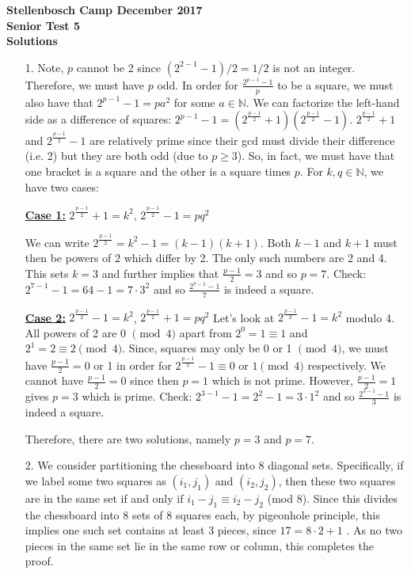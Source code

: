 \documentclass[a4paper, 12pt]{article}
\begin{document}
\begin{center}
\textbf{Stellenbosch Camp December 2017 \\ Senior Test 5} \\
\textbf{Solutions}
\end{center}


\begin{enumerate}

    \item[1.] Note, $p$ cannot be 2 since $(2^{2-1}-1)/2 =  1/2$ is not an integer. Therefore, we must have $p$ odd. In order for $\frac{2^{p-1}-1}{p}$ to be a square, we must also have that $2^{p-1}-1 = p a^2$ for some $a\in \mathbb{N}$. We can factorize the left-hand side as a difference of squares:  $2^{p-1}-1 = (2^\frac{p-1}{2}+1)(2^\frac{p-1}{2}-1)$. $2^\frac{p-1}{2}+1$ and $2^\frac{p-1}{2}-1$ are relatively prime since their gcd must divide their difference (i.e. 2) but they are both odd (due to $p\geq 3$). So, in fact, we must have that one bracket is a square and the other is a square times $p$. For $k,q \in \mathbb{N}$, we have two cases:
  
  \underline{\textbf{Case 1:}} $2^\frac{p-1}{2}+1=k^2$, $2^\frac{p-1}{2}-1 = pq^2$

We can write $2^\frac{p-1}{2} = k^2-1 = (k-1)(k+1)$. Both $k-1$ and $k+1$ must then be powers of 2 which differ by 2. The only such numbers are 2 and 4. This sets $k=3$ and further implies that $\frac{p-1}{2}=3$ and so $p=7$. Check: $2^{7-1}-1 = 64-1 = 7\cdot 3^2$ and so $\frac{2^{7-1}-1}{7}$ is indeed a square.
  
  \underline{\textbf{Case 2:}} $2^\frac{p-1}{2}-1=k^2$, $2^\frac{p-1}{2}+1 = pq^2$
  Let's look at $2^\frac{p-1}{2}-1=k^2$ modulo 4. All powers of 2 are 0 $\pmod{4}$ apart from $2^0=1 \equiv 1$ and $2^1=2 \equiv 2 \pmod{4}$. Since, squares may only be 0 or 1 $\pmod{4}$, we must have $\frac{p-1}{2} = 0$ or 1 in order for $2^\frac{p-1}{2}-1 \equiv 0$ or $1 \pmod{4}$ respectively. We cannot have $\frac{p-1}{2} = 0$ since then $p=1$ which is not prime. However, $\frac{p-1}{2} = 1$ gives $p=3$ which is prime. Check: $2^{3-1}-1 = 2^2-1 = 3\cdot 1^2$ and so $\frac{2^{3-1}-1}{3}$ is indeed a square. 
  
  Therefore, there are two solutions, namely $p=3$ and $p=7$.
    
    
    \item[2.] We consider partitioning the chessboard into 8 diagonal sets. Specifically, if we label some two squares as $(i_1, j_1)$ and $(i_2, j_2)$, then these two squares are in the same set if and only if $i_1 - j_1 \equiv i_2 - j_2$ (mod 8). Since this divides the chessboard into 8 sets of 8 squares each, by pigeonhole principle, this implies one such set contains at least 3 pieces, since $17 = 8 \cdot 2 + 1$ . As no two pieces in the same set lie in the same row or column, this completes the proof.
    

\end{enumerate}
\end{document}
